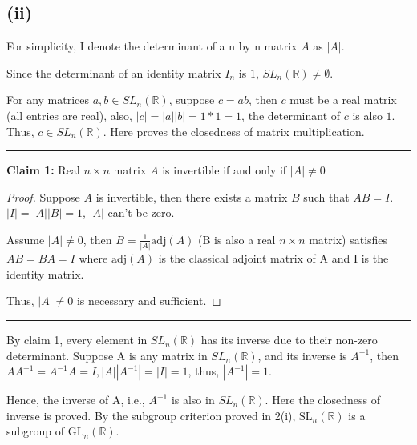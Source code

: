 \documentclass[12pt]{article}
\begin{document}
\subsection*{(ii)}
For simplicity, I denote the determinant of a n by n matrix $A$ as $|A|$.

Since the determinant of an identity matrix $I_n$ is $1$, $SL_n(\mathbb{R})\ne \emptyset$.

For any matrices $a,b\in SL_n(\mathbb{R})$, suppose $c=ab$, then $c$ must be a real matrix (all entries are real), also, $|c|=|a||b|=1*1=1$, the determinant of $c$ is also $1$. Thus, $c\in SL_n(\mathbb{R})$. Here proves the closedness of matrix multiplication.

\noindent\rule{\textwidth}{1pt}
\noindent \textbf{Claim 1: } Real $n\times n$ matrix $A$ is invertible if and only if $|A|\ne0$
\begin{proof}
Suppose $A$ is invertible, then there exists a matrix $B$ such that $AB=I$. $|I|=|A||B|=1$, $|A|$ can't be zero. 

Assume $|A|\ne 0$, then $B=\frac{1}{|A|}\mathrm{adj}(A)$ (B is also a real $n\times n$ matrix) satisfies $AB=BA=I$ where $\mathrm{adj}(A)$ is the classical adjoint matrix of A and I is the identity matrix.

Thus, $|A|\ne 0$ is necessary and sufficient.
\end{proof}
\noindent\rule{\textwidth}{1pt}

By claim 1, every element in $SL_n(\mathbb{R})$ has its inverse due to their non-zero determinant. Suppose A is any matrix in $SL_n(\mathbb{R})$, and its inverse is $A^{-1}$, then $AA^{-1}=A^{-1}A=I,|A||A^{-1}|=|I|=1$, thus, $|A^{-1}|=1$.

Hence, the inverse of A, i.e., $A^{-1}$ is also in $SL_n(\mathbb{R})$. Here the closedness of inverse is proved. By the subgroup criterion proved in 2(i), $\mathrm{SL}_n({\mathbb{R}})$ is a subgroup of $\mathrm{GL}_n({\mathbb{R}})$.


\newpage
\section{} %
\end{document}
